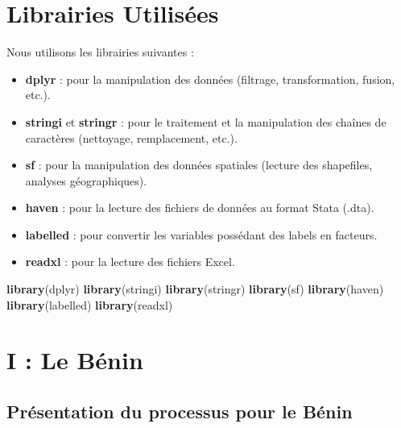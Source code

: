 \documentclass[
]{article}
\newenvironment{Shaded}{\begin{snugshade}}{\end{snugshade}}
\newcommand{\FunctionTok}[1]{\textcolor[rgb]{0.13,0.29,0.53}{\textbf{#1}}}
\newcommand{\NormalTok}[1]{#1}
\providecommand{\tightlist}{%
  \setlength{\itemsep}{0pt}\setlength{\parskip}{0pt}}
\begin{document}
\hypertarget{librairies-utilisuxe9es}{%
\section{Librairies Utilisées}\label{librairies-utilisuxe9es}}

Nous utilisons les librairies suivantes :

\begin{itemize}
\tightlist
\item
  \textbf{dplyr} : pour la manipulation des données (filtrage,
  transformation, fusion, etc.).
\item
  \textbf{stringi} et \textbf{stringr} : pour le traitement et la
  manipulation des chaînes de caractères (nettoyage, remplacement,
  etc.).
\item
  \textbf{sf} : pour la manipulation des données spatiales (lecture des
  shapefiles, analyses géographiques).
\item
  \textbf{haven} : pour la lecture des fichiers de données au format
  Stata (.dta).
\item
  \textbf{labelled} : pour convertir les variables possédant des labels
  en facteurs.
\item
  \textbf{readxl} : pour la lecture des fichiers Excel.
\end{itemize}

\begin{Shaded}
\begin{Highlighting}[]
\FunctionTok{library}\NormalTok{(dplyr)}
\FunctionTok{library}\NormalTok{(stringi)}
\FunctionTok{library}\NormalTok{(stringr)}
\FunctionTok{library}\NormalTok{(sf)}
\FunctionTok{library}\NormalTok{(haven)}
\FunctionTok{library}\NormalTok{(labelled)}
\FunctionTok{library}\NormalTok{(readxl)}
\end{Highlighting}
\end{Shaded}

\hypertarget{i-le-buxe9nin}{%
\section{I : Le Bénin}\label{i-le-buxe9nin}}

\hypertarget{pruxe9sentation-du-processus-pour-le-buxe9nin}{%
\subsection{Présentation du processus pour le
Bénin}\label{pruxe9sentation-du-processus-pour-le-buxe9nin}}
\end{document}
